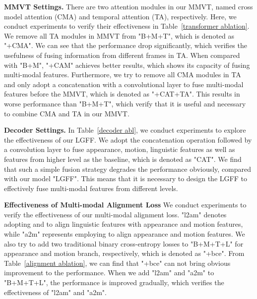 \documentclass[10pt,twocolumn,letterpaper]{article}
\begin{document}
\noindent\textbf{MMVT Settings.} 
There are two attention modules in our MMVT, named cross model attention (CMA) and temporal attention (TA), respectively. Here, we conduct experiments to verify their effectiveness in Table~\ref{transformer ablation}. We remove all TA modules in MMVT from "B+M+T", which is denoted as "+CMA". We can see that the performance drop significantly, which verifies the usefulness of fusing information from different frames in TA. When compared with "B+M", "+CAM" achieves better results, which shows its capacity of fusing multi-modal features. Furthermore, we try to remove all CMA modules in TA and only adopt a concatenation with a convolutional layer to fuse multi-modal features before the MMVT, which is denoted as "+CAT+TA". This results in worse performance than "B+M+T", which verify that it is useful and necessary to combine CMA and TA in our MMVT. 


\noindent\textbf{Decoder Settings.} 
In Table~\ref{decoder abl}, we conduct experiments to explore the effectiveness of our LGFF. We adopt the concatenation operation followed by a  convolution layer to fuse appearance, motion, linguistic features as well as features from higher level as the baseline, which is denoted as "CAT". We find that such a simple fusion strategy degrades the performance obviously, compared with our model "LGFF". This means that it is necessary to design the LGFF to effectively fuse multi-modal features from different levels.

\noindent\textbf{Effectiveness of Multi-modal Alignment Loss} 
We conduct experiments to verify the effectiveness of our multi-modal alignment loss. "l2am" denotes adopting  and  to align linguistic features with appearance and motion features, while "a2m" represents employing  to align appearance and motion features. We also try to add two traditional binary cross-entropy losses to "B+M+T+L" for appearance and motion branch, respectively, which is denoted as "+bce". From Table~\ref{alignment ablation}, we can find that "+bce" can not bring obvious improvement to the performance. When we add "l2am" and "a2m" to "B+M+T+L", the performance is improved gradually, which verifies the effectiveness of "l2am" and "a2m".
\end{document}
